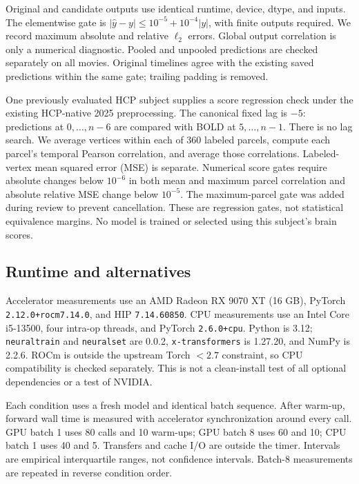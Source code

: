 \documentclass[10pt]{article}
\begin{document}
Original and candidate outputs use identical runtime, device, dtype, and inputs.
The elementwise gate is $|\hat y-y|\leq10^{-5}+10^{-4}|y|$, with finite
outputs required. We record maximum absolute and relative $\ell_2$ errors.
Global output correlation is only a numerical diagnostic. Pooled and unpooled
predictions are checked separately on all movies. Original timelines agree with
the existing saved predictions within the same gate; trailing padding is removed.

One previously evaluated HCP subject supplies a score regression check under
the existing HCP-native 2025 preprocessing. The canonical fixed lag is $-5$:
predictions at $0,\ldots,n-6$ are compared with BOLD at $5,\ldots,n-1$.
There is no lag search. We average vertices within each of 360 labeled parcels,
compute each parcel's temporal Pearson correlation, and average those
correlations. Labeled-vertex mean squared error (MSE) is separate.
Numerical score gates require absolute changes below $10^{-6}$ in both mean
and maximum parcel correlation and absolute relative MSE change below $10^{-5}$.
The maximum-parcel gate was added during review to prevent cancellation.
These are regression gates, not statistical equivalence margins. No model
is trained or selected using this subject's brain scores.

\subsection{Runtime and alternatives}
Accelerator measurements use an AMD Radeon RX 9070 XT (16 GB), PyTorch
\texttt{2.12.0+rocm7.14.0}, and HIP \texttt{7.14.60850}. CPU measurements use
an Intel Core i5-13500, four intra-op threads, and PyTorch \texttt{2.6.0+cpu}.
Python is 3.12; \texttt{neuraltrain} and \texttt{neuralset} are 0.0.2,
\texttt{x-transformers} is 1.27.20, and NumPy is 2.2.6. ROCm is outside the
upstream Torch $<2.7$ constraint, so CPU compatibility is checked separately.
This is not a clean-install test of all optional dependencies or a test of NVIDIA.

Each condition uses a fresh model and identical batch sequence. After warm-up,
forward wall time is measured with accelerator synchronization around every call.
GPU batch 1 uses 80 calls and 10 warm-ups; GPU batch 8 uses 60 and 10;
CPU batch 1 uses 40 and 5. Transfers and cache I/O are outside the timer.
Intervals are empirical interquartile ranges, not confidence intervals.
Batch-8 measurements are repeated in reverse condition order.
\end{document}
